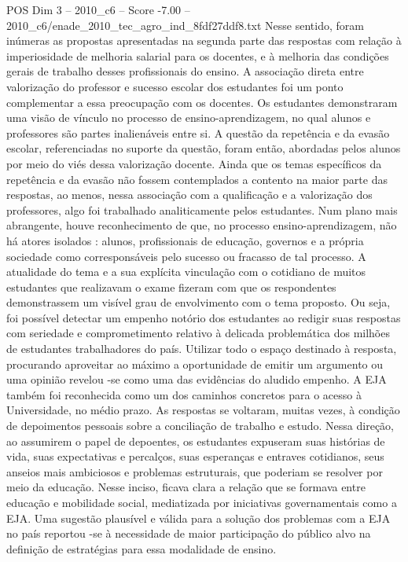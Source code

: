 \begin{textsample}{POS Dim 3 – 2010\_c6 – Score -7.00 – 2010\_c6/enade\_2010\_tec\_agro\_ind\_8fdf27ddf8.txt}
Nesse sentido, foram inúmeras as propostas apresentadas na segunda parte das respostas com relação à imperiosidade de melhoria salarial para os docentes, e à melhoria das condições gerais de trabalho desses profissionais do ensino.
A associação direta entre valorização do professor e sucesso escolar dos estudantes foi um ponto complementar a essa preocupação com os docentes.
Os estudantes demonstraram uma visão de vínculo no processo de ensino-aprendizagem, no qual alunos e professores são partes inalienáveis entre si.
A questão da repetência e da evasão escolar, referenciadas no suporte da questão, foram então, abordadas pelos alunos por meio do viés dessa valorização docente.
Ainda que os temas específicos da repetência e da evasão não fossem contemplados a contento na maior parte das respostas, ao menos, nessa associação com a qualificação e a valorização dos professores, algo foi trabalhado analiticamente pelos estudantes.
Num plano mais abrangente, houve reconhecimento de que, no processo ensino-aprendizagem, não há atores isolados : alunos, profissionais de educação, governos e a própria sociedade como corresponsáveis pelo sucesso ou fracasso de tal processo.
A atualidade do tema e a sua explícita vinculação com o cotidiano de muitos estudantes que realizavam o exame fizeram com que os respondentes demonstrassem um visível grau de envolvimento com o tema proposto.
Ou seja, foi possível detectar um empenho notório dos estudantes ao redigir suas respostas com seriedade e comprometimento relativo à delicada problemática dos milhões de estudantes trabalhadores do país.
Utilizar todo o espaço destinado à resposta, procurando aproveitar ao máximo a oportunidade de emitir um argumento ou uma opinião revelou -se como uma das evidências do aludido empenho.
A EJA também foi reconhecida como um dos caminhos concretos para o acesso à Universidade, no médio prazo.
As respostas se voltaram, muitas vezes, à condição de depoimentos pessoais sobre a conciliação de trabalho e estudo.
Nessa direção, ao assumirem o papel de depoentes, os estudantes expuseram suas histórias de vida, suas expectativas e percalços, suas esperanças e entraves cotidianos, seus anseios mais ambiciosos e problemas estruturais, que poderiam se resolver por meio da educação.
Nesse inciso, ficava clara a relação que se formava entre educação e mobilidade social, mediatizada por iniciativas governamentais como a EJA.
Uma sugestão plausível e válida para a solução dos problemas com a EJA no país reportou -se à necessidade de maior participação do público alvo na definição de estratégias para essa modalidade de ensino.

\end{textsample}
